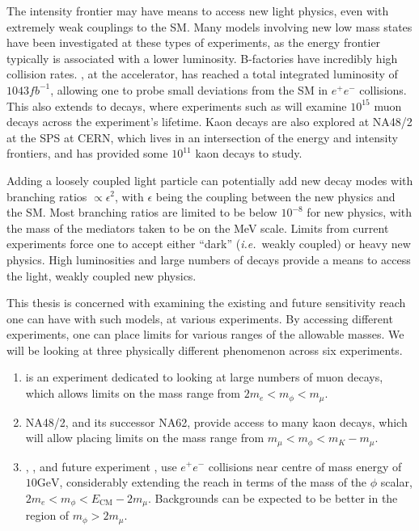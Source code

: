 \label{chapter:experiments}

The intensity frontier may have means to access new light physics, even with extremely weak couplings to the SM.
Many models involving new low mass states have been investigated at these types of experiments, as the energy frontier typically is associated with a lower luminosity.
B-factories have incredibly high collision rates.
\belle, at the \kekb accelerator, has reached a total integrated luminosity of $1043fb^{-1}$, allowing one to probe small deviations from the SM in $e^+ e^-$ collisions.
This also extends to decays, where experiments such as \mueee will examine $10^{15}$ muon decays across the experiment's lifetime.
Kaon decays are also explored at NA48/2 at the SPS at CERN, which lives in an intersection of the energy and intensity frontiers, and has provided some $10^{11}$ kaon decays to study.

Adding a loosely coupled light particle can potentially add new decay modes with branching ratios $\propto \epsilon^2$, with $\epsilon$ being the coupling between the new physics and the SM.
Most branching ratios are limited to be below $10^{-8}$ for new physics, with the mass of the mediators taken to be on the MeV scale.
Limits from current experiments force one to accept either ``dark'' ({\em i.e.}\ weakly coupled) or heavy new physics.
High luminosities and large numbers of decays provide a means to access the light, weakly coupled new physics.

This thesis is concerned with examining the existing and future sensitivity reach one can have with such models, at various experiments.
By accessing different experiments, one can place limits for various ranges of the allowable masses.
We will be looking at three physically different phenomenon across six experiments.
\begin{enumerate}
    \item \mueee is an experiment dedicated to looking at large numbers of muon decays, which allows limits on the mass range from $2 m_e < m_\phi < m_\mu$.
    \item NA48/2, and its successor NA62, provide access to many kaon decays, which will allow placing limits on the mass range from $m_\mu < m_\phi < m_K - m_\mu$.
    \item \babar, \belle, and future experiment \belletwo, use $e^+ e^-$ collisions near centre of mass energy of $10\textrm{GeV}$, considerably extending the reach in terms of the mass of the $\phi$ scalar, $2m_e < m_\phi < E_\textrm{CM} - 2 m_\mu$. Backgrounds can be expected to be better in the region of $m_\phi > 2 m_\mu$.
\end{enumerate}

